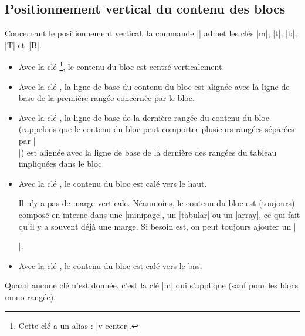 \documentclass[dvipsnames]{article}%
\begin{document}
\subsection{Positionnement vertical du contenu des blocs}


\label{vertical-pos-block}

Concernant le positionnement vertical, la commande |\Block| admet les clés
|m|, |t|, |b|, |T| et~|B|.


\begin{itemize}
\item {}
Avec la clé \footnote{Cette clé a un alias : |v-center|.}, le
contenu du bloc est centré verticalement. 

\item Avec la clé , la ligne de base du contenu du bloc est alignée avec la
ligne de base de la première rangée concernée par le bloc.

\item Avec la clé , la ligne de base de la dernière rangée du
contenu du bloc (rappelons que le contenu du bloc peut comporter plusieurs
rangées séparées par |\\|) est alignée avec la ligne de base de la dernière des
rangées du tableau impliquées dans le bloc.

\item Avec la clé , le contenu du bloc est calé vers le haut.

Il n'y a pas de marge verticale. Néanmoins, le contenu du bloc est (toujours)
composé en interne dans une |{minipage}|, un |{tabular}| ou un |{array}|, ce qui
fait qu'il y a souvent déjà une marge. Si besoin est, on peut toujours ajouter
un |\strut|.

\item Avec la clé , le contenu du bloc est calé vers le bas.
\end{itemize}

Quand aucune clé n'est donnée, c'est la clé |m| qui s'applique (sauf pour
les blocs mono-rangée).
\end{document}
